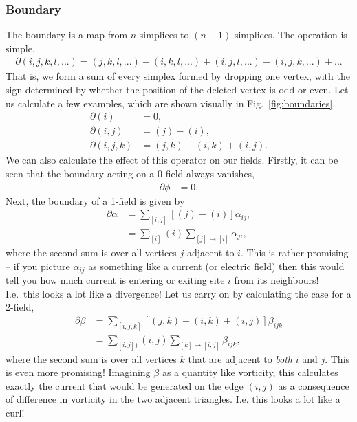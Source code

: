 \documentclass[11pt, oneside]{article} %
\numberwithin{equation}{section}
\begin{document}
\subsubsection{Boundary}
The boundary is a map from $n$-simplices to $(n-1)$-simplices. The operation is simple, 
\begin{align}
    \partial (i,j,k,l,...) = (j,k,l,...) - (i,k,l,...) + (i,j,l,...) - (i,j,k,...) + ...
\end{align}
That is, we form a sum of every simplex formed by dropping one vertex, with the sign determined by whether the position of the deleted vertex is odd or even. Let us calculate a few examples, which are shown visually in Fig.~\ref{fig:boundaries},
\begin{align}
    \partial (i) &= 0, \\
    \partial (i,j) &= (j) - (i), \\
    \partial (i,j,k) &= (j,k) - (i,k) + (i,j).
\end{align}
We can also calculate the effect of this operator on our fields. Firstly, it can be seen that the boundary acting on a 0-field always vanishes,
\begin{align}
    \partial \phi & = 0.
\end{align}
Next, the boundary of a 1-field is given by
\begin{align}
    \partial \alpha & = \sum_{[i,j]}
    \left [ 
    (j) - (i)
    \right ]
    \alpha_{ij} , \\
    & = \sum_{[i]} (i) \sum_{[j] \rightarrow [i]}
    \alpha_{ji},
\end{align}
where the second sum is over all vertices $j$ adjacent to $i$. This is rather promising -- if you picture $\alpha_{ij}$ as something like a current (or electric field) then this would tell you how much current is entering or exiting site $i$ from its neighbours! I.e.~this looks a lot like a divergence! Let us carry on by calculating the case for a 2-field,
\begin{align}
    \partial \beta &= \sum_{[i,j,k]} 
    \left [
    (j,k) - (i,k) + (i,j)
    \right ]
    \beta_{ijk} \\
    & = \sum_{[i,j])} (i,j) 
    \sum_{[k]\rightarrow [i,j]}
    \beta_{ijk},
\end{align}
where the second sum is over all vertices $k$ that are adjacent to \textit{both} $i$ and $j$. This is even more promising! Imagining $\beta$ as a quantity like vorticity, this calculates exactly the current that would be generated on the edge $(i,j)$ as a consequence of difference in vorticity in the two adjacent triangles. I.e. this looks a lot like a curl!
\end{document}
